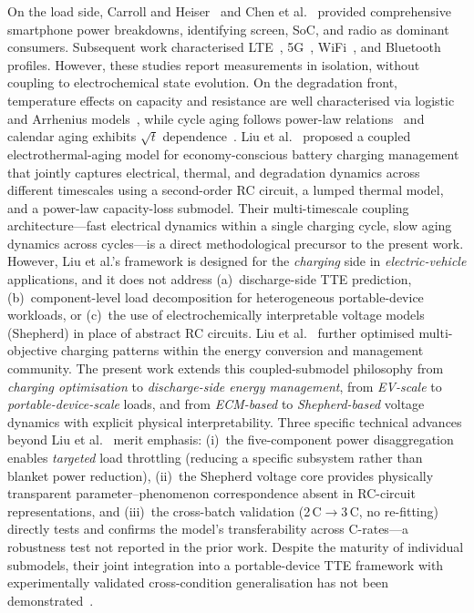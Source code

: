\documentclass[5p,times,number]{elsarticle}
\begin{document}
On the load side, Carroll and Heiser~\cite{Carroll2010} and Chen et al.~\cite{Chen2014} provided comprehensive smartphone power breakdowns, identifying screen, SoC, and radio as dominant consumers.
Subsequent work characterised LTE~\cite{Lauridsen2014}, 5G~\cite{Xu2020}, WiFi~\cite{Sun2018}, and Bluetooth~\cite{Negri2006} profiles.
However, these studies report measurements in isolation, without coupling to electrochemical state evolution.
On the degradation front, temperature effects on capacity and resistance are well characterised via logistic and Arrhenius models~\cite{Ali2020,Chen2025,He2017,Whittingham2012,Tang2019ECM}, while cycle aging follows power-law relations~\cite{Vetter2005,Kou2017,Li2019} and calendar aging exhibits $\sqrt{t}$ dependence~\cite{Vetter2005}.
Liu et al.~\cite{Liu2019ECM} proposed a coupled electrothermal-aging model for economy-conscious battery charging management that jointly captures electrical, thermal, and degradation dynamics across different timescales using a second-order RC circuit, a lumped thermal model, and a power-law capacity-loss submodel.
Their multi-timescale coupling architecture---fast electrical dynamics within a single charging cycle, slow aging dynamics across cycles---is a direct methodological precursor to the present work.
However, Liu et al.'s framework is designed for the \emph{charging} side in \emph{electric-vehicle} applications, and it does not address (a)~discharge-side TTE prediction, (b)~component-level load decomposition for heterogeneous portable-device workloads, or (c)~the use of electrochemically interpretable voltage models (Shepherd) in place of abstract RC circuits.
Liu et al.~\cite{Liu2018ECM} further optimised multi-objective charging patterns within the energy conversion and management community.
The present work extends this coupled-submodel philosophy from \emph{charging optimisation} to \emph{discharge-side energy management}, from \emph{EV-scale} to \emph{portable-device-scale} loads, and from \emph{ECM-based} to \emph{Shepherd-based} voltage dynamics with explicit physical interpretability.
Three specific technical advances beyond Liu et al.~\cite{Liu2019ECM} merit emphasis: (i)~the five-component power disaggregation enables \emph{targeted} load throttling (reducing a specific subsystem rather than blanket power reduction), (ii)~the Shepherd voltage core provides physically transparent parameter--phenomenon correspondence absent in RC-circuit representations, and (iii)~the cross-batch validation (2\,C$\to$3\,C, no re-fitting) directly tests and confirms the model's transferability across C-rates---a robustness test not reported in the prior work.
Despite the maturity of individual submodels, their joint integration into a portable-device TTE framework with experimentally validated cross-condition generalisation has not been demonstrated~\cite{Tian2019,Xiong2018,Mama2025,Yu2025}.
\end{document}
